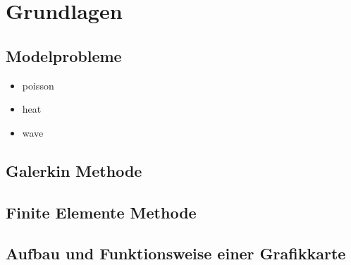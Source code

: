 \documentclass[crop=false]{standalone}
\begin{document}
  \section{Grundlagen} %
  \label{sec:background}

    \subsection{Modelprobleme} %
    \label{sub:modelprobleme}
      \begin{itemize}
        \item poisson
        \item heat
        \item wave
      \end{itemize}

    \subsection{Galerkin Methode} %
    \label{sub:galerkin_methode}


    \subsection{Finite Elemente Methode} %
    \label{sub:finite_elemente_methode}


    \subsection{Aufbau und Funktionsweise einer Grafikkarte} %
    \label{sub:aufbau_und_funktionsweise_einer_grafikkarte}


\end{document}
